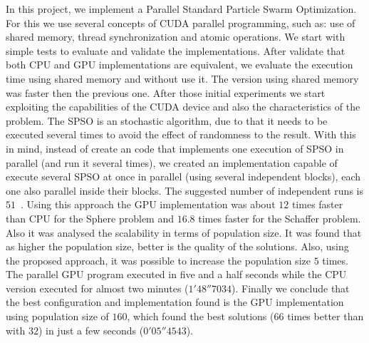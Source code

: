 \documentclass{article}
\begin{document}
    In this project, we implement a Parallel Standard Particle Swarm Optimization.
    For this we use several concepts of CUDA parallel programming, such as: use of shared memory, thread synchronization and atomic operations.
    We start with simple tests to evaluate and validate the implementations.
    After validate that both CPU and GPU implementations are equivalent, we evaluate the execution time using shared memory and without use it. The version using shared memory was faster then the previous one. After those initial experiments we start exploiting the capabilities of the CUDA device and also the characteristics of the problem. The SPSO is an stochastic algorithm, due to that it needs to be executed several times to avoid the effect of randomness to the result. With this in mind, instead of create an code that implements one execution of SPSO in parallel (and run it several times), we created an implementation capable of execute several SPSO at once in parallel (using several independent blocks), each one also parallel inside their blocks. The suggested number of independent runs is $51$~\cite{SPSO}. Using this approach the GPU implementation was about $12$ times faster than CPU for the Sphere problem and $16.8$ times faster for the Schaffer problem.
    Also it was analysed the scalability in terms of population size.
    It was found that as higher the population size, better is the quality of the solutions.
    Also, using the proposed approach, it was possible to increase the population size $5$ times.
    The parallel GPU program executed in five and a half seconds while the CPU version executed for almost two minutes ($1'48''7034$). Finally we conclude that the best configuration and implementation found is the GPU implementation using population size of $160$, which found the best solutions ($66$ times better than with $32$) in just a few seconds ($0'05''4543$).


    
     
\end{document}
